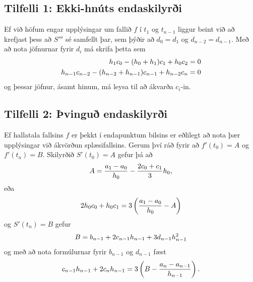 \documentclass[letterpaper,10pt,icelandic]{sphinxmanual}
\begin{document}
\subsection{Tilfelli 1: Ekki-hnúts endaskilyrði}
\label{kafli03:tilfelli-1-ekki-hnuts-endaskilyri}
Ef við höfum engar upplýsingar um fallið \(f\) í \(t_1\) og
\(t_{n-1}\) liggur beint við að krefjast þess að \(S'''\) sé
samfellt þar, sem þýðir að \(d_0 = d_1\) og
\(d_{n-2} = d_{n-1}\). Með að nota jöfnurnar fyrir \(d_i\) má
skrifa þetta sem
\begin{gather}
\begin{split}\begin{aligned}
    h_1c_0 - (h_0 + h_1)c_1 + h_0c_2 = 0 \\
    h_{n-1}c_{n-2}-(h_{n-2}+h_{n-1})c_{n-1}+h_{n-2}c_n = 0\end{aligned}\end{split}\notag
\end{gather}
og þessar jöfnur, ásamt hinum, má leysa til að ákvarða \(c_i\)-in.


\subsection{Tilfelli 2: Þvinguð endaskilyrði}
\label{kafli03:tilfelli-2-vingu-endaskilyri}
Ef hallatala fallsins \(f\) er þekkt í endapunktum bilsins er
eðlilegt að nota þær upplýsingar við ákvörðun splæsifallsins. Gerum því
ráð fyrir að \(f'(t_0) = A\) og \(f'(t_n) = B\). Skilyrðið
\(S'(t_0) = A\) gefur þá að
\begin{gather}
\begin{split}A = \frac{a_1-a_0}{h_0} - \frac{2c_0+c_1}{3}h_0,\end{split}\notag
\end{gather}
eða
\begin{gather}
\begin{split}2h_0c_0 + h_0c_1 =
    3 \left( \frac{a_1-a_0}{h_0} - A \right)\end{split}\notag
\end{gather}
og \(S'(t_n) = B\) gefur
\begin{gather}
\begin{split}B = b_{n-1} + 2c_{n-1}h_{n-1} + 3d_{n-1}h_{n-1}^2\end{split}\notag
\end{gather}
og með að nota formúlurnar fyrir \(b_{n-1}\) og \(d_{n-1}\)
fæst
\begin{gather}
\begin{split}c_{n-1}h_{n-1} + 2c_nh_{n-1} =
    3 \left( B  - \frac{a_n-a_{n-1}}{h_{n-1}} \right).\end{split}\notag
\end{gather}
\end{document}
